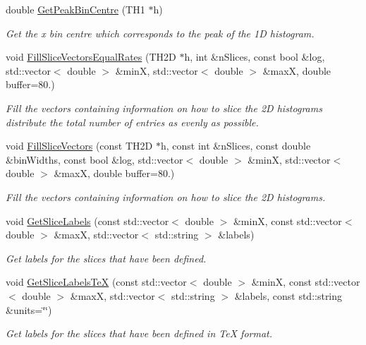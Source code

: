 \begin{DoxyCompactItemize}
double \hyperlink{namespacecalib_a60a5ea8e534e449cc2daa4dce2b570cb}{Get\-Peak\-Bin\-Centre} (T\-H1 $\ast$h)
\begin{DoxyCompactList}\small\item\em Get the x bin centre which corresponds to the peak of the 1\-D histogram. \end{DoxyCompactList}\item 
void \hyperlink{namespacecalib_ab7394e2ac9ddb0399fd7887f91fe3473}{Fill\-Slice\-Vectors\-Equal\-Rates} (T\-H2\-D $\ast$h, int \&n\-Slices, const bool \&log, std\-::vector$<$ double $>$ \&min\-X, std\-::vector$<$ double $>$ \&max\-X, double buffer=80.)
\begin{DoxyCompactList}\small\item\em Fill the vectors containing information on how to slice the 2\-D histograms distribute the total number of entries as evenly as possible. \end{DoxyCompactList}\item 
void \hyperlink{namespacecalib_ae7237c68dfcaaaa495f89fb810364229}{Fill\-Slice\-Vectors} (const T\-H2\-D $\ast$h, const int \&n\-Slices, const double \&bin\-Widths, const bool \&log, std\-::vector$<$ double $>$ \&min\-X, std\-::vector$<$ double $>$ \&max\-X, double buffer=80.)
\begin{DoxyCompactList}\small\item\em Fill the vectors containing information on how to slice the 2\-D histograms. \end{DoxyCompactList}\item 
void \hyperlink{namespacecalib_a5a983ce6a49b9859e49c9d3edb73b60e}{Get\-Slice\-Labels} (const std\-::vector$<$ double $>$ \&min\-X, const std\-::vector$<$ double $>$ \&max\-X, std\-::vector$<$ std\-::string $>$ \&labels)
\begin{DoxyCompactList}\small\item\em Get labels for the slices that have been defined. \end{DoxyCompactList}\item 
void \hyperlink{namespacecalib_abd137fd17c09e5cd7f72cce6747df25d}{Get\-Slice\-Labels\-Te\-X} (const std\-::vector$<$ double $>$ \&min\-X, const std\-::vector$<$ double $>$ \&max\-X, std\-::vector$<$ std\-::string $>$ \&labels, const std\-::string \&units=\char`\"{}\char`\"{})
\begin{DoxyCompactList}\small\item\em Get labels for the slices that have been defined in Te\-X format. \end{DoxyCompactList}\item 

\end{DoxyCompactItemize}
